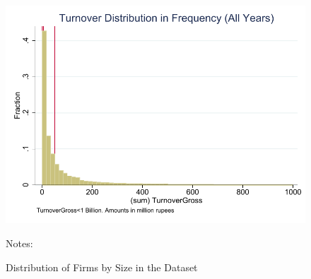 \newpage{}

\begin{figure}[t]
\label{fig:Distribution_of_Firms}

\caption{Distribution of Firms by Size in the Dataset}
\vspace{0.2cm}

\begin{centering}
\includegraphics[width=1\textwidth]{graphs/TurnoverDistribution_Fraction_WeaklyPositive} 
\par\end{centering}
{\footnotesize{}{}{}Notes: }{\footnotesize \par}
\end{figure}

\newpage{}

